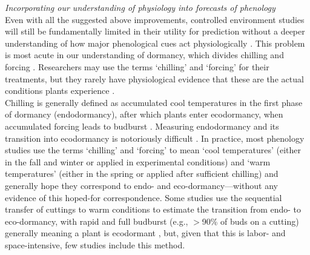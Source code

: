 \documentclass[11pt,letter]{article}
\begin{document}

\emph{Incorporating our understanding of physiology into forecasts of phenology}\\
Even with all the suggested above improvements, controlled environment studies will still be fundamentally limited in their utility for prediction without a deeper understanding of how major phenological cues act physiologically \citep{Bahuguna2015}. This problem is most acute in our understanding of dormancy, which divides chilling and forcing \citep{chang2021}. Researchers may use the terms `chilling' and `forcing' for their treatments, but they rarely have physiological evidence that these are the actual conditions plants experience \citep[][]{chuine2016}. \\

Chilling is generally defined as accumulated cool temperatures in the first phase of dormancy (endodormancy), after which plants enter ecodormancy, when accumulated forcing leads to budburst \citep{chuine2016}. Measuring endodormancy and its transition into ecodormancy is notoriously difficult  \citep[e.g.,][]{Junttila:2012aa}. In practice, most phenology studies use the terms `chilling' and `forcing' to mean `cool temperatures' (either in the fall and winter or applied in experimental conditions) and `warm temperatures' (either in the spring or applied after sufficient chilling) and generally hope they correspond to endo- and eco-dormancy---without any evidence of this hoped-for correspondence. Some studies use the sequential transfer of cuttings to warm conditions to estimate the transition from endo- to eco-dormancy, with rapid and full budburst (e.g., $>$90\% of buds on a cutting) generally meaning a plant is ecodormant \citep[e.g.,][]{Junttila:2012aa}, but, given that this is labor- and space-intensive, few studies include this method. \\
\end{document}
